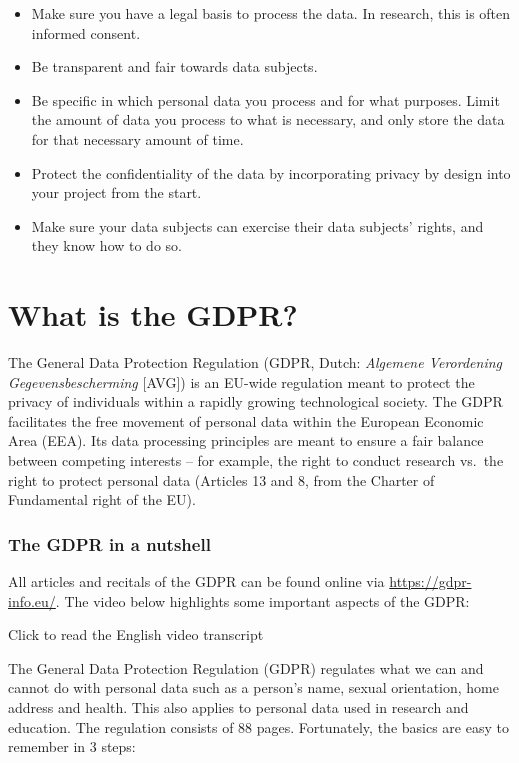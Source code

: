 \documentclass[
]{book}
\providecommand{\tightlist}{%
  \setlength{\itemsep}{0pt}\setlength{\parskip}{0pt}}
\begin{document}
\begin{itemize}
\tightlist
\item
  Make sure you have a legal basis to process the
  data. In research, this is often informed consent.
\item
  Be transparent and fair towards data subjects.
\item
  Be specific in which personal data you process and for what purposes. Limit
  the amount of data you process to what is necessary, and only store the data
  for that necessary amount of time.
\item
  Protect the confidentiality of the data by incorporating
  privacy by design into your project from the start.
\item
  Make sure your data subjects can exercise their
  data subjects' rights, and they know how to
  do so.
\end{itemize}

\hypertarget{what-is-the-gdpr}{%
\section{What is the GDPR?}\label{what-is-the-gdpr}}

The General Data Protection Regulation (GDPR, Dutch: \emph{Algemene Verordening
Gegevensbescherming} {[}AVG{]}) is an EU-wide regulation meant to protect the privacy
of individuals within a rapidly growing technological society. The GDPR facilitates
the free movement of personal data within the European Economic Area (EEA). Its
data processing principles are meant to ensure a fair balance between competing
interests -- for example, the right to conduct research vs.~the right to protect
personal data (Articles 13 and 8, from the Charter of Fundamental right of the EU).

\hypertarget{the-gdpr-in-a-nutshell}{%
\subsubsection{The GDPR in a nutshell}\label{the-gdpr-in-a-nutshell}}

All articles and recitals of the GDPR can be found online via \url{https://gdpr-info.eu/}.
The video below highlights some important aspects of the GDPR:

Click to read the English video transcript

The General Data Protection Regulation (GDPR) regulates what we can
and cannot do with personal data such as a person's name, sexual orientation,
home address and health. This also applies to personal data used in research
and education. The regulation consists of 88 pages. Fortunately, the basics
are easy to remember in 3 steps:
\end{document}
